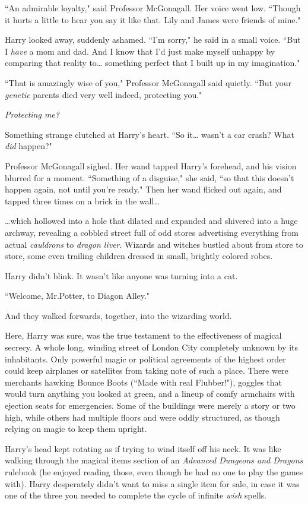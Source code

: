 ``An admirable loyalty," said Professor McGonagall. Her voice went low. ``Though it hurts a little to hear you say it like that. Lily and James were friends of mine."

Harry looked away, suddenly ashamed. ``I'm sorry," he said in a small voice. ``But I \emph{have} a mom and dad. And I know that I'd just make myself unhappy by comparing that reality to{\ldots} something perfect that I built up in my imagination."

``That is amazingly wise of you," Professor McGonagall said quietly. ``But your \emph{genetic} parents died very well indeed, protecting you."

\emph{Protecting me?}

Something strange clutched at Harry's heart. ``So it{\ldots} wasn't a car crash? What \emph{did} happen?"

Professor McGonagall sighed. Her wand tapped Harry's forehead, and his vision blurred for a moment. ``Something of a disguise," she said, ``so that this doesn't happen again, not until you're ready." Then her wand flicked out again, and tapped three times on a brick in the wall{\ldots}

{\ldots}which hollowed into a hole that dilated and expanded and shivered into a huge archway, revealing a cobbled street full of odd stores advertising everything from actual \emph{cauldrons} to \emph{dragon liver}. Wizards and witches bustled about from store to store, some even trailing children dressed in small, brightly colored robes.

Harry didn't blink. It wasn't like anyone was turning into a cat.

``Welcome, Mr.\?Potter, to Diagon Alley."

And they walked forwards, together, into the wizarding world.

Here, Harry was sure, was the true testament to the effectiveness of magical secrecy. A whole long, winding street of London City completely unknown by its inhabitants. Only powerful magic or political agreements of the highest order could keep airplanes or satellites from taking note of such a place. There were merchants hawking
Bounce Boots (``Made with real Flubber!"), goggles that would turn anything you looked at green, and a lineup of comfy armchairs with ejection seats for emergencies. Some of the buildings were merely a story or two high, while others had multiple floors and were oddly structured, as though relying on magic to keep them upright.

Harry's head kept rotating as if trying to wind itself off his neck. It was like walking through the magical items section of an \emph{Advanced Dungeons and Dragons} rulebook (he enjoyed reading those, even though he had no one to play the games with). Harry desperately didn't want to miss a single item for sale, in case it was one of the three you needed to complete the cycle of infinite \emph{wish} spells.

